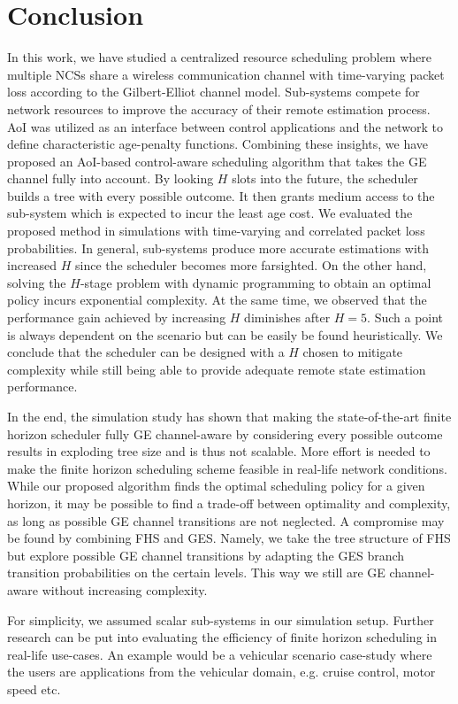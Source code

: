 \chapter{Conclusion}

In this work, we have studied a centralized resource scheduling problem where
multiple NCSs share a wireless communication channel with time-varying packet
loss according to the Gilbert-Elliot channel model. Sub-systems compete for
network resources to improve the accuracy of their remote estimation process.
AoI was utilized as an interface between control applications and the network to
define characteristic age-penalty functions. Combining these insights, we have
proposed an AoI-based control-aware scheduling algorithm that takes the GE
channel fully into account. By looking $H$ slots into the future, the scheduler
builds a tree with every possible outcome. It then grants medium access to the
sub-system which is expected to incur the least age cost. We evaluated the
proposed method in simulations with time-varying and correlated packet loss
probabilities. In general, sub-systems produce more accurate estimations with
increased $H$ since the scheduler becomes more farsighted. On the other hand,
solving the $H$-stage problem with dynamic programming to obtain an optimal
policy incurs exponential complexity. At the same time, we observed that the
performance gain achieved by increasing $H$ diminishes after $H=5$. Such a point
is always dependent on the scenario but can be easily be found heuristically. We
conclude that the scheduler can be designed with a $H$ chosen to mitigate
complexity while still being able to provide adequate remote state estimation
performance. 

In the end, the simulation study has shown that making the state-of-the-art
finite horizon scheduler fully GE channel-aware by considering every possible
outcome results in exploding tree size and is thus not scalable. More effort is
needed to make the finite horizon scheduling scheme feasible in real-life
network conditions. While our proposed algorithm finds the optimal scheduling
policy for a given horizon, it may be possible to find a trade-off between
optimality and complexity, as long as possible GE channel transitions are not
neglected. A compromise may be found by combining FHS and GES. Namely, we take
the tree structure of FHS but explore possible GE channel transitions by
adapting the GES branch transition probabilities on the certain levels. This way
we still are GE channel-aware without increasing complexity.

For simplicity, we assumed scalar sub-systems in our simulation setup. Further
research can be put into evaluating the efficiency of finite horizon scheduling
in real-life use-cases. An example would be a vehicular scenario case-study
where the users are applications from the vehicular domain, e.g. cruise control,
motor speed etc. 

